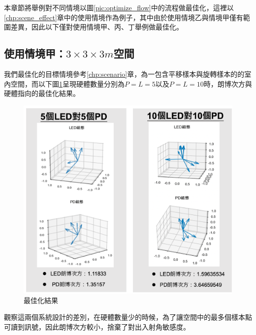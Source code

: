 本章節將舉例對不同情境以圖\ref{pic:optimize_flow}中的流程做最佳化，這裡以\ref{chp:scene_effect}章中的使用情境作為例子，其中由於使用情境乙與情境甲僅有範圍差異，因此以下僅對使用情境甲、丙、丁舉例做最佳化。

    \subsection{使用情境甲：$3\times 3\times 3m$空間}
    \label{chp:optimiza_A}

    我們最佳化的目標情境參考\ref{chp:scenario}章，為一包含平移樣本與旋轉樣本的的室內空間，而以下圖\ref{pic:opt_result}呈現硬體數量分別為$P=L=5$以及$P=L=10$時，朗博次方與硬體指向的最佳化結果。

    \begin{figure}[htpb]
        \centering
        \includegraphics[width=15cm]{ch5pic/opt_result.png}
        \caption{最佳化結果}
        \label{pic:opt_result}
    \end{figure}

    觀察這兩個系統設計的差別，在硬體數量少的時候，為了讓空間中的最多個樣本點可讀到訊號，因此朗博次方較小，捨棄了對出入射角敏感度。

